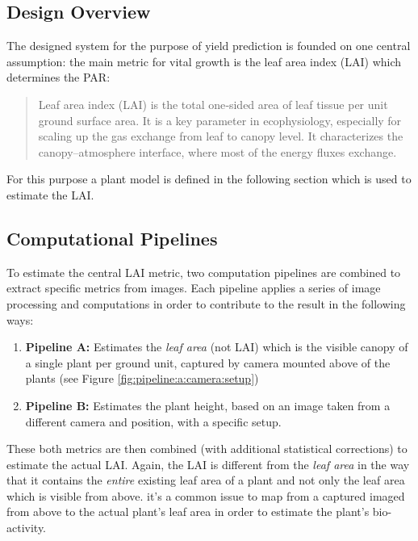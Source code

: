 \graphicspath{{members/ssr/figures/modelling}}

\subsection{Design Overview}\label{null:design-overview}


The designed system for the purpose of yield prediction is founded on one central assumption: 
the main metric for vital growth is the leaf area index (LAI) which determines the PAR:

\begin{quote}
    Leaf area index (LAI) is the total one‐sided area of leaf tissue per unit ground surface area.
    It is a key parameter in ecophysiology, especially for scaling up the gas exchange from leaf
    to canopy level.
    It characterizes the canopy–atmosphere interface, where most of the energy fluxes exchange. \cite{beda:nathalie}
\end{quote}

For this purpose a plant model is defined in the following section which is used to estimate
the LAI.



\subsection{Computational Pipelines}\label{subsec:computational-pipelines}


To estimate the central LAI metric, two computation pipelines are combined to extract specific metrics from images.
Each pipeline applies a series of image processing and computations in order to contribute to the result
in the following ways:

\begin{enumerate}
    \item \textbf{Pipeline A:} Estimates the \textit{leaf area} (not LAI) which is the visible canopy
    of a single plant per ground unit, captured by camera mounted above of the plants (see Figure \ref{fig:pipeline:a:camera:setup})
    \item \textbf{Pipeline B:} Estimates the plant height, based on an image taken from a different camera and position,
    with a specific setup.
\end{enumerate}

These both metrics are then combined (with additional statistical corrections) to estimate the actual LAI.
Again, the LAI is different from the \textit{leaf area} in the way that it contains
the \textit{entire} existing leaf area of a plant and not only the leaf area which is visible from above.
it's a common issue to map from a captured imaged from above to the actual plant's leaf area in order
to estimate the plant's bio-activity.

